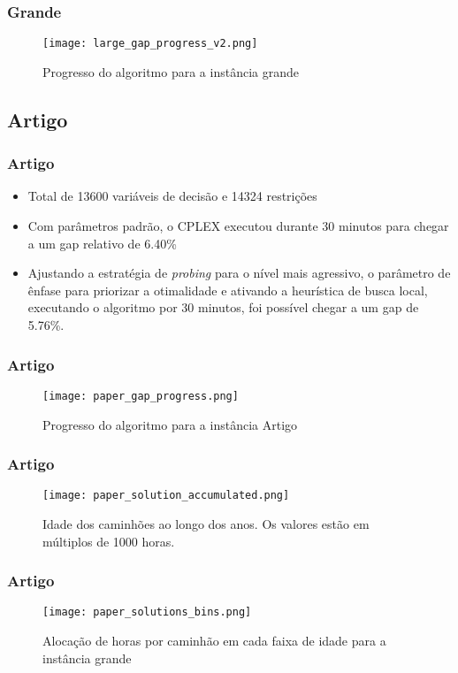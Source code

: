\documentclass{beamer}
\begin{document}
\begin{frame}
	\frametitle{Grande}
	
	\begin{figure}[h!]
		\centering
		\texttt{[image: large\_gap\_progress\_v2.png]}
		\caption{Progresso do algoritmo para a instância grande}
		\label{fig:large_gap_progress_v2}
	\end{figure}
\end{frame}

\subsection{Artigo}

\begin{frame}
	\frametitle{Artigo}
	\begin{itemize}
		\item Total de 13600 variáveis de decisão e 14324 restrições
		\item Com parâmetros padrão, o CPLEX executou durante 30 minutos para chegar a um gap relativo de 6.40\%
		\item Ajustando a estratégia de \textit{probing} para o nível mais agressivo, o parâmetro de ênfase  para priorizar a otimalidade e ativando a heurística de busca local, executando o algoritmo por 30 minutos, foi possível chegar a um gap de 5.76\%.
	\end{itemize}
\end{frame}

\begin{frame}
	\frametitle{Artigo}
	\begin{figure}[h!]
		\centering
		\texttt{[image: paper\_gap\_progress.png]}
		\caption{Progresso do algoritmo para a instância Artigo}
		\label{fig:paper_gap_progress}
	\end{figure}
\end{frame}

\begin{frame}
	\frametitle{Artigo}
	\begin{figure}[h!]
		\centering
		\texttt{[image: paper\_solution\_accumulated.png]}
		\caption{Idade dos caminhões ao longo dos anos. Os valores estão em múltiplos de 1000 horas.}
		\label{fig:paper_solution_accumulated}
	\end{figure}

\end{frame}

\begin{frame}
	\frametitle{Artigo}
	\begin{figure}[h!]
		\centering
		\texttt{[image: paper\_solutions\_bins.png]}
		\caption{Alocação de horas por caminhão em cada faixa de idade para a instância grande}
		\label{fig:paper_solutions_bins}
	\end{figure}
		
\end{frame}
\end{document}
